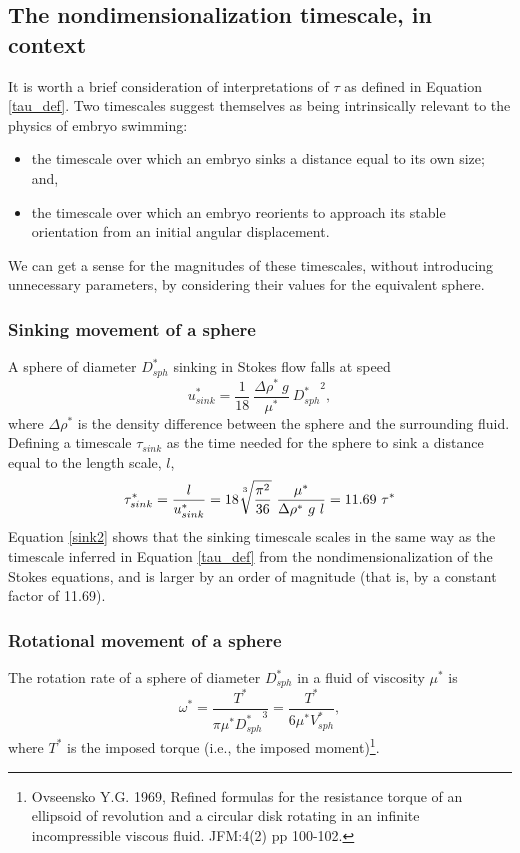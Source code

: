 \documentclass[10pt,a4paper]{article}
\begin{document}
\subsection{The nondimensionalization timescale, in context}
It is worth a brief consideration of interpretations of $\tau$ as defined in Equation \ref{tau_def}.
Two timescales suggest themselves as being intrinsically relevant to the physics of embryo swimming:
\begin{itemize}
	\item the timescale over which an embryo sinks a distance equal to its own size; and,
	\item the timescale over which an embryo reorients to approach its stable orientation from an initial angular displacement.
\end{itemize}
We can get a sense for the magnitudes of these timescales, without introducing unnecessary parameters, by considering their values for the equivalent sphere.

\subsubsection{Sinking movement of a sphere}\label{SinkSect}
A sphere of diameter $D_{sph}^*$ sinking in Stokes flow falls at speed
 \begin{equation}\label{sink1}
 	u_{sink}^* = \frac{1}{18} ~ \frac{\Delta \rho^* ~ g}{\mu^*}  ~ {D_{sph}^*}^2,
 \end{equation}
where $\Delta \rho^*$ is the density difference between the sphere and the surrounding fluid.
Defining a timescale $\tau_{sink}$ as the time needed for the sphere to sink a distance equal to the length scale, $l$,
\begin{equation}\label{sink2}
	\tau^*_{sink} = \frac{l}{u_{sink}^*} = 18 \sqrt[\uproot{5}3]{\frac{\pi^2}{36}} ~ \frac{\mu^*}{\Delta \rho^* ~ g ~ l} 
	              = 11.69 ~ \tau^*
\end{equation}
Equation \ref{sink2} shows that the sinking timescale scales in the same way as the timescale inferred in Equation \ref{tau_def} from the nondimensionalization of the Stokes equations, and is larger by an order of magnitude (that is, by a constant factor of 11.69).

\subsubsection{Rotational movement of a sphere}\label{RotSect}
The rotation rate of a sphere of diameter $D_{sph}^*$ in a fluid of viscosity $\mu^*$ is 
\begin{equation}\label{rot1}
	\omega^* = \frac{T^*}{\pi \mu^* {D_{sph}^*}^3} = \frac{T^*}{6 \mu^* V_{sph}^*},	
\end{equation}
where $T^*$ is the imposed torque (i.e., the imposed moment)\footnote{Ovseensko Y.G. 1969, Refined formulas for the resistance torque of an ellipsoid of revolution and a circular disk rotating in an infinite incompressible viscous fluid. JFM:4(2) pp 100-102.}.
\end{document}
